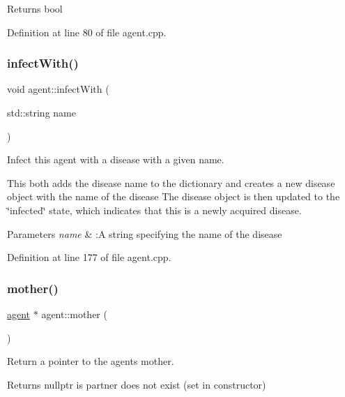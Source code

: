 \begin{DoxyReturn}{Returns}
bool 
\end{DoxyReturn}


Definition at line 80 of file agent.\+cpp.

\mbox{\label{classagent_ac55fabf889e49a48c055c9c495062d5e}} 
\subsubsection{\texorpdfstring{infect\+With()}{infectWith()}}
{\footnotesize\ttfamily void agent\+::infect\+With (\begin{DoxyParamCaption}\item[{std\+::string}]{name }\end{DoxyParamCaption})}



Infect this agent with a disease with a given name. 

This both adds the disease name to the dictionary and creates a new disease object with the name of the disease The disease object is then updated to the \char`\"{}infected\char`\"{} state, which indicates that this is a newly acquired disease.


\begin{DoxyParams}{Parameters}
{\em name} & \+:A string specifying the name of the disease \\
\hline
\end{DoxyParams}


Definition at line 177 of file agent.\+cpp.

\mbox{\label{classagent_a6853ae2b9f4b349bd748105699dd43e4}} 
\subsubsection{\texorpdfstring{mother()}{mother()}}
{\footnotesize\ttfamily \mbox{\hyperlink{classagent}{agent}} $\ast$ agent\+::mother (\begin{DoxyParamCaption}{ }\end{DoxyParamCaption})}



Return a pointer to the agent\textquotesingle{}s mother. 

Returns nullptr is partner does not exist (set in constructor)

